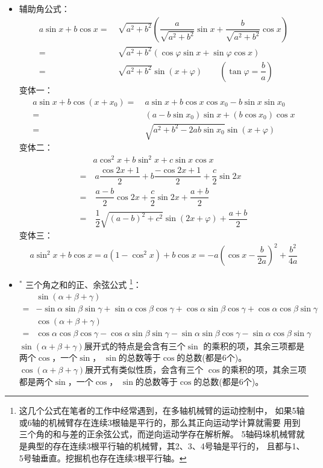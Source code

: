 \begin{itemize}[leftmargin=\inteval{\myitemleftmargin}pt,itemsep=
   \inteval{\myitemitempsep}pt,topsep=\inteval{\myitemtopsep}pt]
\item 辅助角公式：
\begin{align*}
a\sin x+b\cos x 
=&\  \sqrt{a^2+b^2}\left(\dfrac{a}{\sqrt{a^2+b^2}}\sin x+\dfrac{b}{\sqrt{a^2+b^2}}\cos x \right) \\
=&\  \sqrt{a^2+b^2}\left(\cos\varphi\sin x+\sin\varphi\cos x \right) \\
=&\  \sqrt{a^2+b^2}\sin(x+\varphi) \quad\quad 
\left(\tan \varphi=\dfrac{b}{a}\right)
\end{align*}
变体一：
\begin{align*}
a\sin x+b\cos (x+x_0) 
=&\  a\sin x+b\cos x\cos x_0-b\sin x\sin x_0 \\
=&\  (a-b\sin x_0)\sin x+(b\cos x_0)\cos x \\
=&\  \sqrt{a^2+b^2-2ab\sin x_0}\sin(x+\varphi) 
\end{align*}
变体二：
\begin{align*}
&a\cos^2x+b\sin^2x+c\sin x\cos x \\
=&\  a\dfrac{\cos2x+1}{2} +b\dfrac{-\cos2x+1}{2}+\dfrac{c}{2}\sin2x \\
=&\  \dfrac{a-b}{2}\cos2x+\dfrac{c}{2}\sin2x+\dfrac{a+b}{2} \\
=&\  \dfrac{1}{2}\sqrt{(a-b)^2+c^2}\sin(2x+\varphi)+\dfrac{a+b}{2}
\end{align*}
变体三：
\begin{align*}
a\sin^2x+b\cos x=a(1-\cos^2x)+b\cos x=
-a\left( \cos x-\dfrac{b}{2a}\right) ^2+\dfrac{b^2}{4a}
\end{align*}

\item $ ^* $ 三个角之和的正、余弦公式
\footnote{这几个公式在笔者的工作中经常遇到，在多轴机械臂的运动控制中，
    如果5轴或6轴的机械臂存在连续3根轴是平行的，那么其正向运动学计算就需要
    用到三个角的和与差的正余弦公式，而逆向运动学存在解析解。
    5轴码垛机械臂就是典型的存在连续3根平行轴的机械臂，其2、3、4号轴是平行的，
    且都与1、5号轴垂直。挖掘机也存在连续3根平行轴。}：
\begin{align*}
    &\sin(\alpha+\beta+\gamma)\\
    =&-\sin\alpha\sin\beta\sin\gamma
    +\sin \alpha \cos \beta \cos \gamma  + \cos \alpha \sin \beta 
    \cos \gamma + \cos \alpha \cos \beta \sin \gamma  \\
    &\cos(\alpha+\beta+\gamma)\\ 
    =& \cos \alpha \cos \beta \cos\gamma
    -\cos\alpha  \sin \beta \sin \gamma - \sin \alpha \sin \beta 
    \cos \gamma - \sin \alpha \cos \beta \sin \gamma
\end{align*}
$ \sin(\alpha+\beta+\gamma) $展开式的特点是会含有三个$ \sin $
的乘积的项，其余三项都是两个$ \cos $，一个$ \sin $，
$ \sin $的总数等于$ \cos $的总数(都是6个)。
$ \cos(\alpha+\beta+\gamma) $展开式有类似性质，会含有三个
$ \cos $的乘积的项，其余三项都是两个$ \sin $，一个$ \cos $，
$ \sin $的总数等于$ \cos $的总数(都是6个)。


\end{itemize}
